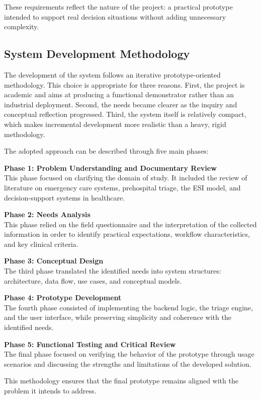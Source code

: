 \documentclass[a4paper,12pt,oneside]{report}
\begin{document}
These requirements reflect the nature of the project: a practical prototype intended to support real decision situations without adding unnecessary complexity.

\subsection{System Development Methodology}

The development of the system follows an iterative prototype-oriented methodology. This choice is appropriate for three reasons. First, the project is academic and aims at producing a functional demonstrator rather than an industrial deployment. Second, the needs became clearer as the inquiry and conceptual reflection progressed. Third, the system itself is relatively compact, which makes incremental development more realistic than a heavy, rigid methodology.

The adopted approach can be described through five main phases:

\textbf{Phase 1: Problem Understanding and Documentary Review} \\
This phase focused on clarifying the domain of study. It included the review of literature on emergency care systems, prehospital triage, the ESI model, and decision-support systems in healthcare.

\textbf{Phase 2: Needs Analysis} \\
This phase relied on the field questionnaire and the interpretation of the collected information in order to identify practical expectations, workflow characteristics, and key clinical criteria.

\textbf{Phase 3: Conceptual Design} \\
The third phase translated the identified needs into system structures: architecture, data flow, use cases, and conceptual models.

\textbf{Phase 4: Prototype Development} \\
The fourth phase consisted of implementing the backend logic, the triage engine, and the user interface, while preserving simplicity and coherence with the identified needs.

\textbf{Phase 5: Functional Testing and Critical Review} \\
The final phase focused on verifying the behavior of the prototype through usage scenarios and discussing the strengths and limitations of the developed solution.

This methodology ensures that the final prototype remains aligned with the problem it intends to address.
\end{document}
